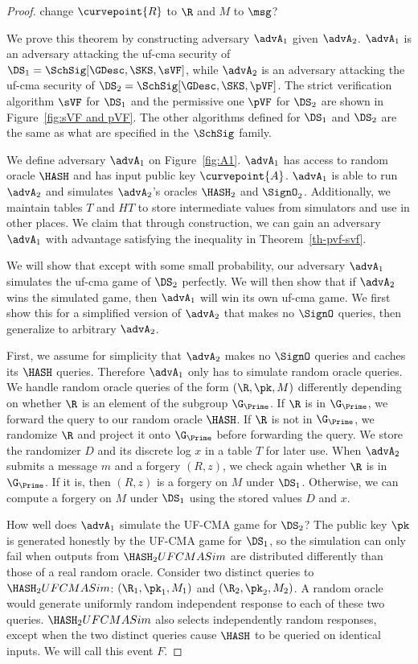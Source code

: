 \begin{proof}
	{\color{red} change $\curvepoint{R}$ to $\R$ and $M$ to $\msg$?}
	
	We prove this theorem by constructing adversary $\advA_1$ given $\advA_2$.  $\advA_1$ is an adversary attacking the uf-cma security of $\DS_1= \SchSig[\GDesc,\SKS,\sVF]$, while $\advA_2$ is an adversary attacking the uf-cma security of $\DS_2= \SchSig[\GDesc,\SKS,\pVF]$. The strict verification algorithm $\sVF$ for $\DS_1$ and the permissive one $\pVF$ for  $\DS_2$ are shown in Figure~\ref{fig:sVF and pVF}. The other algorithms defined for $\DS_1$ and $\DS_2$ are the same as what are specified in the $\SchSig$ family.
	
	We define adversary $\advA_1$ on Figure~\ref{fig:A1}. $\advA_1$ has access to random oracle $\HASH$ and has input public key $\curvepoint{A}$. $\advA_1$ is able to run $\advA_2$ and simulates $\advA_2$'s oracles $\HASH_2$ and $\SignO_2$. Additionally, we maintain tables $T$ and $HT$ to store intermediate values from simulators and use in other places. We claim that through construction, we can gain an adversary $\advA_1$ with advantage satisfying the inequality in Theorem~\ref{th-pvf-svf}. 
	
	We will show that except with some small probability, our adversary $\advA_1$ simulates the uf-cma game of $\DS_2$ perfectly. We will then show that if $\advA_2$ wins the simulated game, then $\advA_1$ will win its own uf-cma game. We first show this for a simplified version of $\advA_2$ that makes no $\SignO$ queries, then generalize to arbitrary $\advA_2$. 
	
	First, we assume for simplicity that $\advA_2$ makes no $\SignO$ queries and caches its $\HASH$ queries. Therefore $\advA_1$ only has to simulate random oracle queries. We handle random oracle queries of the form $(\R, \pk, M)$ differently depending on whether $\R$ is an element of the subgroup $\G_\Prime$. If $\R$ is in $\G_\Prime$, we forward the query to our random oracle $\HASH$. If $\R$ is not in $\G_\Prime$, we randomize $\R$ and project it onto $\G_\Prime$ before forwarding the query. We store the randomizer $D$ and its discrete log $x$ in a table $T$ for later use. When $\advA_2$ submits a message $m$ and a forgery $(R, z)$, we check again whether $\R$ is in $\G_\Prime$. If it is, then $(R, z)$ is a forgery on $M$ under $\DS_1$. Otherwise, we can compute a forgery on $M$ under $\DS_1$ using the stored values $D$ and $x$.
	
	How well does $\advA_1$ simulate the UF-CMA game for $\DS_2$? The public key $\pk$ is generated honestly by the UF-CMA game for $\DS_1$, so the simulation can only fail when outputs from $\HASH_2UFCMASim$ are distributed differently than those of a real random oracle. Consider two distinct queries to $\HASH_2UFCMASim$: $(\R_1, \pk_1, M_1)$ and $(\R_2, \pk_2, M_2)$. A random oracle would generate uniformly random independent response to each of these two queries. $\HASH_2UFCMASim$ also selects independently random responses, except when the two distinct queries cause $\HASH$ to be queried on identical inputs. We will call this event $F$. 
		

\end{proof}

